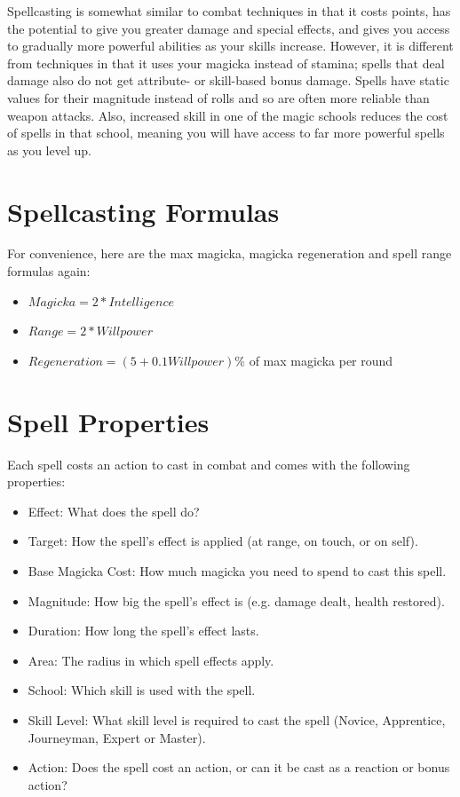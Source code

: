 \documentclass[12pt]{book}
\begin{document}
Spellcasting is somewhat similar to combat techniques in that it costs points, has the potential to give you greater damage and special effects, and gives you access to gradually more powerful abilities as your skills increase. However, it is different from techniques in that it uses your magicka instead of stamina; spells that deal damage also do not get attribute- or skill-based bonus damage. Spells have static values for their magnitude instead of rolls and so are often more reliable than weapon attacks. Also, increased skill in one of the magic schools reduces the cost of spells in that school, meaning you will have access to far more powerful spells as you level up.

\section{Spellcasting Formulas}

For convenience, here are the max magicka, magicka regeneration and spell range formulas again:

\begin{itemize}
	\item $Magicka=2*Intelligence$
	\item $Range=2*Willpower$
	\item $Regeneration=(5+0.1Willpower)\%$ of max magicka per round
\end{itemize}

\section{Spell Properties}

Each spell costs an action to cast in combat and comes with the following properties:

\begin{itemize}
	\item Effect: What does the spell do?
	\item Target: How the spell's effect is applied (at range, on touch, or on self).
	\item Base Magicka Cost: How much magicka you need to spend to cast this spell.
	\item Magnitude: How big the spell's effect is (e.g. damage dealt, health restored).
	\item Duration: How long the spell's effect lasts.
	\item Area: The radius in which spell effects apply.
	\item School: Which skill is used with the spell.
	\item Skill Level: What skill level is required to cast the spell (Novice, Apprentice, Journeyman, Expert or Master).
	\item Action: Does the spell cost an action, or can it be cast as a reaction or bonus action?
\end{itemize}
\end{document}
